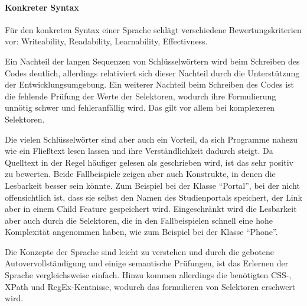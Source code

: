 
    \paragraph{Konkreter Syntax}
    Für den konkreten Syntax einer Sprache schlägt \citet[Kapitel 4.7]{voelter:DslEngineering}
    verschiedene Bewertungskriterien vor: Writeability, Readability, Learnability, Effectivness.

    Ein Nachteil der langen Sequenzen von Schlüsselwörtern wird beim Schreiben des Codes
    deutlich, allerdings relativiert sich dieser Nachteil durch die Unterstützung der Entwicklungsumgebung.
    Ein weiterer Nachteil beim Schreiben des Codes ist die fehlende Prüfung der
    Werte der Selektoren, wodurch ihre Formulierung unnötig schwer und fehleranfällig wird.
    Das gilt vor allem bei komplexeren Selektoren.

    Die vielen Schlüsselwörter sind aber auch ein Vorteil,
    da sich Programme nahezu wie ein Fließtext lesen lassen
    und ihre Verständlichkeit dadurch steigt.
    Da Quelltext in der Regel häufiger gelesen als geschrieben wird,
    ist das sehr positiv zu bewerten.
    Beide Fallbeispiele zeigen aber auch Konstrukte,
    in denen die Lesbarkeit besser sein könnte.
    Zum Beispiel bei der Klasse "`Portal"',
    bei der nicht offensichtlich ist,
    dass sie selbst den Namen des Studienportals speichert,
    der Link aber in einem Child Feature gespeichert wird.
    Eingeschränkt wird die Lesbarkeit aber auch durch die Selektoren,
    die in den Fallbeispielen schnell eine hohe Komplexität angenommen haben,
    wie zum Beispiel bei der Klasse "`Phone"'.

    Die Konzepte der Sprache sind leicht zu verstehen
    und durch die gebotene Autovervollständigung und einige
    semantische Prüfungen, ist das Erlernen der Sprache vergleichsweise einfach.
    Hinzu kommen allerdings die benötigten CSS-, XPath und RegEx-Kentnisse,
    wodurch das formulieren von Selektoren erschwert wird.

